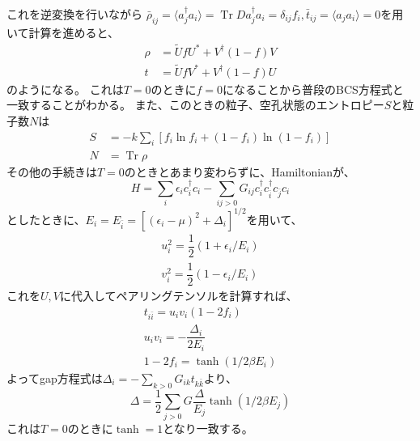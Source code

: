 \documentclass[a4paper]{jsreport}
\begin{document}
  これを逆変換を行いながら
  $\bar{\rho}_{ij}=\langle a_j^\dagger a_i\rangle=\operatorname{Tr}D a_j^\dagger a_i=\delta_{ij}f_i,
  \bar{t}_{ij}=\langle a_j a_i\rangle=0$を用いて計算を進めると、
  \begin{align}
    \rho &= \tilde{U}fU^{*} + V^{\dagger}(1-f)V \\
    t    &= \tilde{U}fV^{*} + V^{\dagger}(1-f)U
  \end{align}
  のようになる。
  これは$T=0$のときに$f=0$になることから普段のBCS方程式と一致することがわかる。
  また、このときの粒子、空孔状態のエントロピー$S$と粒子数$N$は
  \begin{align}
    S &= -k\sum_{i}\left[f_i\ln f_i + (1-f_i)\ln (1 - f_i)\right]\\
    N &= \operatorname{Tr}\rho
  \end{align}
  その他の手続きは$T=0$のときとあまり変わらずに、Hamiltonianが、
  \begin{equation}
    H=\sum_{i}\epsilon_ic_i^{\dagger}c_i-\sum_{ij>0}G_{ij}c_i^{\dagger}c_{\bar{i}}^{\dagger}c_{\bar{j}}c_i
  \end{equation}
  としたときに、$E_i=E_{\bar{i}}=[(\epsilon_i -\mu)^2 +\Delta_i]^{1/2}$を用いて、
  \begin{align}
    u_i^2 = \dfrac{1}{2}(1+\epsilon_i/E_i)\\
    v_i^2 = \dfrac{1}{2}(1-\epsilon_i/E_i)
  \end{align}
  これを$U,V$に代入してペアリングテンソルを計算すれば、
  \begin{align}
    t_{i\bar{i}}=u_iv_i(1-2f_i)\\
    u_iv_i=-\dfrac{\Delta_i}{2E_i}\\
    1-2f_i=\tanh(1/2\beta E_i)
  \end{align}
  よってgap方程式は$\Delta_i=-\sum_{k>0}G_{ik}t_{k\bar{k}}$より、
  \begin{equation}
    \Delta = \dfrac{1}{2}\sum_{j>0}G\dfrac{\Delta}{E_j} \tanh{(1/2\beta E_j)}
  \end{equation}
  これは$T=0$のときに$\tanh = 1$となり一致する。
\end{document}
